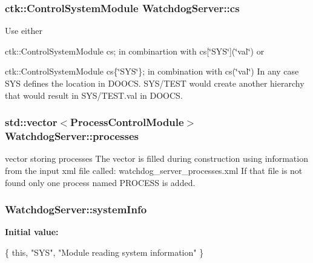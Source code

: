 \subsubsection[{\texorpdfstring{cs}{cs}}]{\setlength{\rightskip}{0pt plus 5cm}ctk\+::\+Control\+System\+Module Watchdog\+Server\+::cs}\hypertarget{structWatchdogServer_ac2a80d4a412c142f8d4753b51e12bfa3}{}\label{structWatchdogServer_ac2a80d4a412c142f8d4753b51e12bfa3}
Use either
\begin{DoxyItemize}
\item ctk\+::\+Control\+System\+Module cs; in combinartion with cs\mbox{[}\char`\"{}\+S\+Y\+S\char`\"{}\mbox{]}(\char`\"{}val\char`\"{}) or
\item ctk\+::\+Control\+System\+Module cs\{\char`\"{}\+S\+Y\+S\char`\"{}\}; in combination with cs(\char`\"{}val\char`\"{}) In any case S\+YS defines the location in D\+O\+O\+CS. S\+Y\+S/\+T\+E\+ST would create another hierarchy that would result in S\+Y\+S/\+T\+E\+S\+T.\+val in D\+O\+O\+CS. 
\end{DoxyItemize}
\subsubsection[{\texorpdfstring{processes}{processes}}]{\setlength{\rightskip}{0pt plus 5cm}std\+::vector$<${\bf Process\+Control\+Module}$>$ Watchdog\+Server\+::processes}\hypertarget{structWatchdogServer_af21c89fb581f3f8ff9d3cf02509634c1}{}\label{structWatchdogServer_af21c89fb581f3f8ff9d3cf02509634c1}
vector storing processes The vector is filled during construction using information from the input xml file called\+: watchdog\+\_\+server\+\_\+processes.\+xml If that file is not found only one process named P\+R\+O\+C\+E\+SS is added. 
\subsubsection[{\texorpdfstring{system\+Info}{systemInfo}}]{ Watchdog\+Server\+::system\+Info}\hypertarget{structWatchdogServer_a433d3ce980aa862c0cf72ccec69846da}{}\label{structWatchdogServer_a433d3ce980aa862c0cf72ccec69846da}
{\bfseries Initial value\+:}
\begin{DoxyCode}
\{ \textcolor{keyword}{this}, \textcolor{stringliteral}{"SYS"},
      \textcolor{stringliteral}{"Module reading system information"} \}
\end{DoxyCode}
